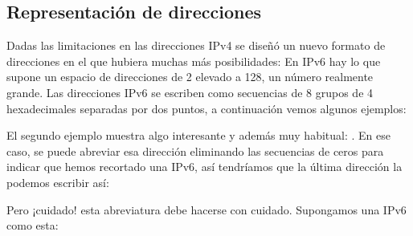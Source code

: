 \documentclass[letterpaper,10pt,spanish]{sphinxmanual}
\begin{document}
\subsection{Representación de direcciones}
\label{\detokenize{t2_integracion_elementos/apuntes_t2:representacion-de-direcciones}}
\sphinxAtStartPar
Dadas las limitaciones en las direcciones IPv4 se diseñó un nuevo formato de direcciones en el que hubiera muchas más posibilidades:  En IPv6 hay  lo que supone un espacio de direcciones de 2 elevado a 128, un número realmente grande. Las direcciones IPv6 se escriben como secuencias de 8 grupos de 4 hexadecimales separadas por dos puntos, a continuación vemos algunos ejemplos:

\begin{sphinxVerbatim}[commandchars=\\\{\}]
\end{sphinxVerbatim}

\sphinxAtStartPar
El segundo ejemplo muestra algo interesante y además muy habitual: . En ese caso, se puede abreviar esa dirección eliminando las secuencias de ceros  para indicar que hemos recortado una IPv6, así tendríamos que la última dirección la podemos escribir así:

\begin{sphinxVerbatim}[commandchars=\\\{\}]
  
 
\end{sphinxVerbatim}

\sphinxAtStartPar
Pero ¡cuidado! esta abreviatura debe hacerse con cuidado. Supongamos una IPv6 como esta:
\end{document}
